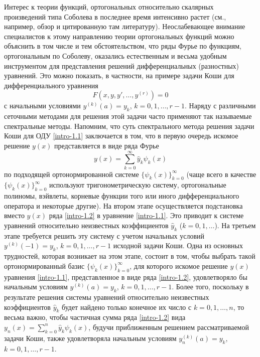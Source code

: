 \Introduction
Интерес к теории функций, ортогональных относительно скалярных произведений типа Соболева в последнее время интенсивно растет  (см., например, обзор \cite{sms-stn-2-MarcelXu} и цитированную там литературу). Неослабевающее внимание специалистов  к этому направлению теории ортогональных функций можно объяснить в том числе и тем обстоятельством, что ряды Фурье по функциям, ортогональным по Соболеву, оказались естественным и весьма удобным инструментом для представления решений  дифференциальных (разностных) уравнений. Это можно показать, в частности, на примере  задачи Коши для дифференциального уравнения
\begin{equation}\label{intro-1.1}
F(x,y,y',\ldots,y^{(r)})=0
 \end{equation}
с начальными условиями $y^{(k)}(a)=y_k$, $k=0,1,\ldots,r-1$.  Наряду с различными сеточными методами для решения этой задачи часто применяют так называемые спектральные методы. Напомним, что суть спектрального метода решения задачи Коши  для ОДУ \eqref{intro-1.1} заключается в том, что в первую очередь искомое решение $y(x)$ представляется в виде ряда Фурье
\begin{equation}\label{intro-1.2}
 y(x)=\sum_{k=0}^\infty \hat y_k\psi_k(x)
 \end{equation}
по подходящей ортонормированной системе $\{\psi_k(x)\}_{k=0}^\infty$ (чаще всего в качестве $\{\psi_k(x)\}_{k=0}^\infty$ используют    тригонометрическую систему, ортогональные полиномы, вэйвлеты, корневые функции того или иного дифференциального оператора  и некоторые другие). На втором этапе осуществляется подстановка вместо $y(x)$ ряда \eqref{intro-1.2} в уравнение \eqref{intro-1.1}. Это приводит к системе уравнений относительно неизвестных коэффициентов $\hat y_k$ ($k=0,1,\ldots$). На третьем этапе требуется решить эту систему с учетом начальных условий  $y^{(k)}(-1)=y_k$, $k=0,1,\ldots,r-1$ исходной задачи Коши.
Одна из основных трудностей, которая возникает на этом этапе, состоит в том, чтобы
выбрать такой ортонормированный базис $\{\psi_k(x)\}_{k=0}^\infty$, для которого искомое решение $y(x)$ уравнения \eqref{intro-1.1}, представленное в виде ряда  \eqref{intro-1.2}, удовлетворяло бы начальным условиям $y^{(k)}(a)=y_k$, $k=0,1,\ldots,r-1$. Более того, поскольку в результате решения системы уравнений относительно неизвестных коэффициентов $\hat y_k$  будет найдено только конечное их число с $k=0,1,\ldots, n$, то весьма важно, чтобы частичная сумма ряда \eqref{intro-1.2} вида $ y_n(x)=\sum_{k=0}^n\hat y_k\psi_k(x)$,
 будучи приближенным решением рассматриваемой задачи Коши, также удовлетворяла начальным условиям $y_n^{(k)}(a)=y_k$, $k=0,1,\ldots,r-1$. 
 

